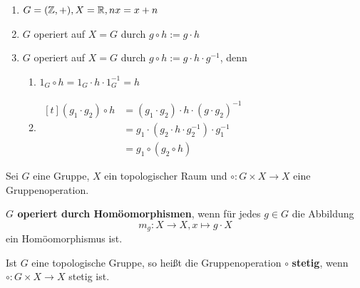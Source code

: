 \begin{beispiel}
    \begin{enumerate}[label=\arabic*),ref=\thebeispiel.\arabic*]
        \item $G = (\mathbb{Z}, +), X = \mathbb{R}, nx = x + n$\label{bsp:gruppenoperation1}
        \item $G$ operiert auf $X = G$ durch $g \circ h := g \cdot h$
        \item $G$ operiert auf $X = G$ durch $g \circ h := g \cdot h \cdot g^{-1}$, denn
        \begin{enumerate}[label=\roman*)]
            \item $1_G \circ h = 1_G \cdot h \cdot 1_G^{-1} = h$
            \item $\!\begin{aligned}[t]
                    (g_1 \cdot g_2) \circ h &= (g_1 \cdot g_2) \cdot h \cdot (g \cdot g_2)^{-1}\\
                        &= g_1 \cdot (g_2 \cdot h \cdot g_2^{-1}) \cdot g_1^{-1}\\
                        &= g_1 \circ (g_2 \circ h)
                  \end{aligned}$
        \end{enumerate}
    \end{enumerate}
\end{beispiel}

\begin{definition}
    Sei $G$ eine Gruppe, $X$ ein topologischer Raum und
    $\circ: G \times X \rightarrow X$ eine Gruppenoperation.

    \begin{defenum}
        \item {}\textbf{$G$ operiert durch Homöomorphismen}, wenn für jedes $g \in G$
              die Abbildung
              \[m_g: X \rightarrow X, x \mapsto g \cdot X\]
              ein Homöomorphismus ist.
        \item Ist $G$ eine topologische Gruppe, so heißt die Gruppenoperation $\circ$
              \textbf{stetig}, wenn 
              $\circ: G \times X \rightarrow X$ stetig ist.
    \end{defenum}
\end{definition}

